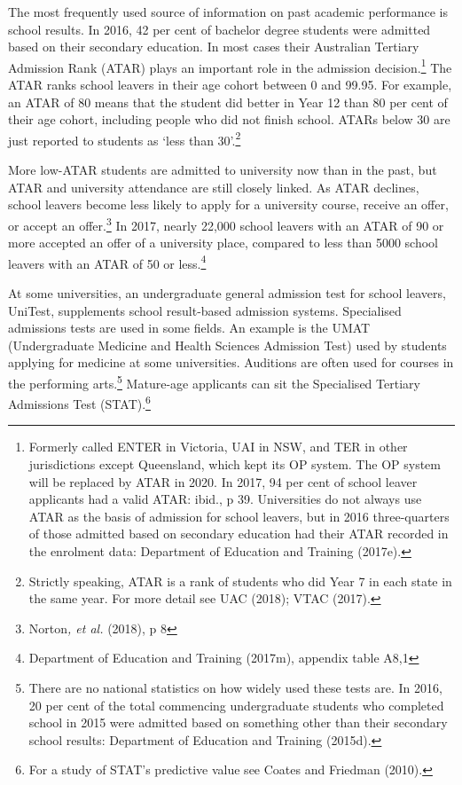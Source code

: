 \documentclass{grattan}
\begin{document}
The most frequently used source of information on past academic performance is school results. In 2016, 42 per cent of bachelor degree students were admitted based on their secondary education. In most cases their Australian Tertiary Admission Rank (ATAR) plays an important role in the admission decision.\footnote{Formerly called ENTER in Victoria, UAI in NSW, and TER in other jurisdictions except Queensland, which kept its OP system. The OP system will be replaced by ATAR in 2020. In 2017, 94 per cent of school leaver applicants had a valid ATAR: ibid., p 39. Universities do not always use ATAR as the basis of admission for school leavers, but in 2016 three-quarters of those admitted based on secondary education had their ATAR recorded in the enrolment data: Department of Education and Training (2017e).} The ATAR ranks school leavers in their age cohort between 0 and 99.95. For example, an ATAR of 80 means that the student did better in Year 12 than 80 per cent of their age cohort, including people who did not finish school. ATARs below 30 are just reported to students as `less than 30'.\footnote{Strictly speaking, ATAR is a rank of students who did Year 7 in each state in the same year. For more detail see UAC (2018); VTAC (2017).}

More low-ATAR students are admitted to university now than in the past, but ATAR and university attendance are still closely linked. As ATAR declines, school leavers become less likely to apply for a university course, receive an offer, or accept an offer.\footnote{Norton\emph{, et al.} (2018), p 8} In 2017, nearly 22,000 school leavers with an ATAR of 90 or more accepted an offer of a university place, compared to less than 5000 school leavers with an ATAR of 50 or less.\footnote{Department of Education and Training (2017m), appendix table A8,1}

At some universities, an undergraduate general admission test for school leavers, UniTest, supplements school result-based admission systems. Specialised admissions tests are used in some fields. An example is the UMAT (Undergraduate Medicine and Health Sciences Admission Test) used by students applying for medicine at some universities. Auditions are often used for courses in the performing arts.\footnote{There are no national statistics on how widely used these tests are. In 2016, 20 per cent of the total commencing undergraduate students who completed school in 2015 were admitted based on something other than their secondary school results: Department of Education and Training (2015d).} Mature-age applicants can sit the Specialised Tertiary Admissions Test (STAT).\footnote{For a study of STAT's predictive value see Coates and Friedman (2010).}
\end{document}
